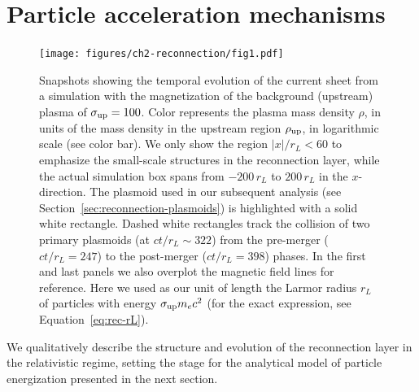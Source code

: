 \section{Particle acceleration mechanisms}
\label{sec:reconnection-qualitative}
\begin{figure}[!ht]
    \centering
    \texttt{[image: figures/ch2-reconnection/fig1.pdf]}
    \caption{Snapshots showing the temporal evolution of the current sheet from a simulation with the magnetization of the background (upstream) plasma of $\sigma_{\rm up}=100$. Color represents the plasma mass density $\rho$, in units of the mass density in the upstream region $\rho_{\rm up}$, in logarithmic scale (see color bar). We only show the region $|x| / r_L < 60$ to emphasize the small-scale structures in the reconnection layer, while the actual simulation box spans from $-200\, r_L$ to $200 \, r_L$ in the $x$-direction.  The plasmoid used in our subsequent analysis (see Section~\ref{sec:reconnection-plasmoids}) is highlighted with a solid white rectangle. Dashed white rectangles track the collision of two primary plasmoids (at $ct/r_L\sim322$) from the pre-merger ($ct/r_L=247$) to the post-merger ($ct/r_L=398$) phases. In the first and last panels we also overplot the magnetic field lines for reference. Here we used as our unit of length the Larmor radius $r_L$ of particles with energy $\sigma_{\rm up} m_e c^2$ (for the exact expression, see Equation~\eqref{eq:rec-rL}).}
    \label{fig:rec-evolution}
\end{figure}

We qualitatively describe the structure and evolution of the reconnection layer in the relativistic regime, setting the stage for the analytical model of particle energization presented in the next section.

